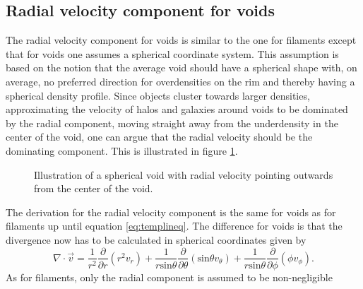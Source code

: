 \subsection{Radial velocity component for voids}
The radial velocity component for voids is similar to the one for filaments
except that for voids one assumes a spherical coordinate system. This assumption
is based on the notion that the average void should have a spherical shape with,
on average, no preferred direction for overdensities on the rim and
thereby having a spherical density profile. Since objects cluster towards larger
densities, approximating the velocity of halos and galaxies around
voids to be dominated by the radial component, moving straight away from the
underdensity in the center of the void, one can argue that the radial velocity
should be the dominating component. This is illustrated in figure \ref{fig:voidvr}.
\begin{figure}
    \begin{center}
    \end{center}
    \caption{Illustration of a spherical void with radial velocity pointing outwards from the center of the void.}
    \label{fig:voidvr}
\end{figure}
The derivation for the radial velocity component is the same for voids as for
filaments up until equation \ref{eq:templineq}. The difference for voids is that
the divergence now has to be calculated in spherical coordinates given by
\begin{equation}
    \nabla\cdot \vec{v}=\frac{1}{r^2}\frac{\partial}{\partial r}(r^2v_r)
                       +\frac{1}{r\mathrm{sin}\theta}\frac{\partial}{\partial \theta}(\mathrm{sin}\theta v_\theta)
                       +\frac{1}{r\mathrm{sin}\theta}\frac{\partial}{\partial \phi}(\phi v_\phi).
\end{equation}
As for filaments, only the radial component is assumed to be non-negligible
